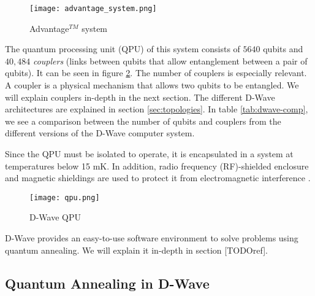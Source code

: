 \begin{figure}[h]
	\texttt{[image: advantage\_system.png]}
	\centering
	\caption{Advantage$^{TM}$ system}
	\label{fig:advantage}
\end{figure}

The quantum processing unit (QPU) of this system consists of $5640$ qubits and $40,484$ \emph{couplers} (links between qubits that allow entanglement between a pair of qubits). It can be seen in figure \ref{fig:QPU}. The number of couplers is especially relevant. A coupler is a physical mechanism that allows two qubits to be entangled. We will explain couplers in-depth in the next section. The different D-Wave architectures are explained in section \ref{sec:topologies}. In table \ref{tab:dwave-comp}, we see a comparison between the number of qubits and couplers from the different versions of the D-Wave computer system.

\begin{table}[h]
	\centering
	\caption{D-Wave historical comparison \cite{DwaveWikipedia}}
	\label{tab:dwave-comp}
\end{table}

Since the QPU must be isolated to operate, it is encapsulated in a system at temperatures below 15 mK. In addition, radio frequency (RF)-shielded enclosure and magnetic shieldings are used to protect it from electromagnetic interference \cite{DWaveDoc}.

\begin{figure}[h]
	\texttt{[image: qpu.png]}
	\centering
	\caption{D-Wave QPU}
	\label{fig:QPU}
\end{figure}

D-Wave provides an easy-to-use software environment to solve problems using quantum annealing. We will explain it in-depth in section [TODOref].


\subsection{Quantum Annealing in D-Wave}
\label{sec:quantum-annealing-dwave}


